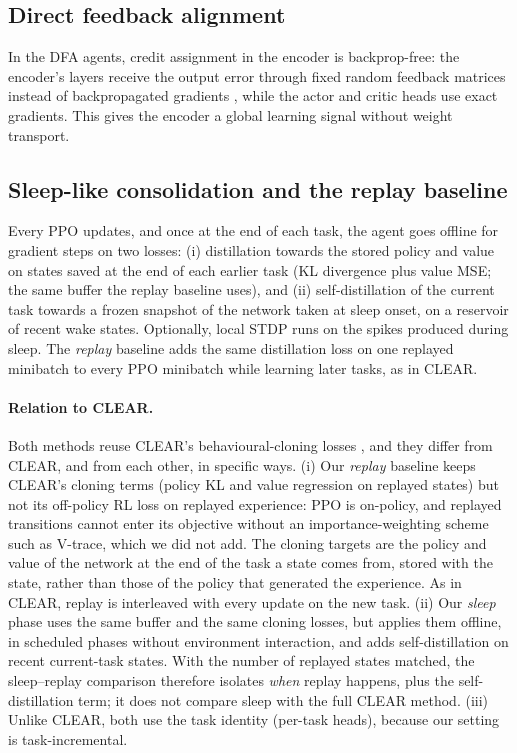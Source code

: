 \documentclass[10pt]{article}
\begin{document}
\subsection{Direct feedback alignment}
In the DFA agents, credit assignment in the encoder is backprop-free: the encoder's layers receive the output error
through fixed random feedback matrices instead of backpropagated gradients \citep{nokland2016direct}, while the actor
and critic heads use exact gradients. This gives the encoder a global learning signal without weight transport.

\subsection{Sleep-like consolidation and the replay baseline}
\label{sec:mech-sleep}
Every \sleepPeriod PPO updates, and once at the end of each task, the agent goes offline for \sleepSteps gradient
steps on two losses: (i) distillation towards the stored policy and value on states saved at the end of each
earlier task (KL divergence plus value MSE; the same buffer the replay baseline uses), and (ii) self-distillation of
the current task towards a frozen snapshot of the network taken at sleep onset, on a reservoir of recent wake states.
Optionally, local STDP runs on the spikes produced during sleep. The \emph{replay} baseline adds the same distillation
loss on one replayed minibatch to every PPO minibatch while learning later tasks, as in CLEAR.

\paragraph{Relation to CLEAR.} Both methods reuse CLEAR's behavioural-cloning losses \citep{rolnick2019experience},
and they differ from CLEAR, and from each other, in specific ways. (i) Our \emph{replay} baseline keeps CLEAR's
cloning terms (policy KL and value regression on replayed states) but not its off-policy RL loss on replayed
experience: PPO is on-policy, and replayed transitions cannot enter its objective without an importance-weighting
scheme such as V-trace, which we did not add. The cloning targets are the policy and value of the network at the end
of the task a state comes from, stored with the state, rather than those of the policy that generated the experience.
As in CLEAR, replay is interleaved with every update on the new task. (ii) Our \emph{sleep} phase uses the same buffer
and the same cloning losses, but applies them offline, in scheduled phases without environment interaction, and adds
self-distillation on recent current-task states. With the number of replayed states matched, the sleep--replay
comparison therefore isolates \emph{when} replay happens, plus the self-distillation term; it does not compare sleep
with the full CLEAR method. (iii) Unlike CLEAR, both use the task identity (per-task heads), because our setting is
task-incremental.
\end{document}
